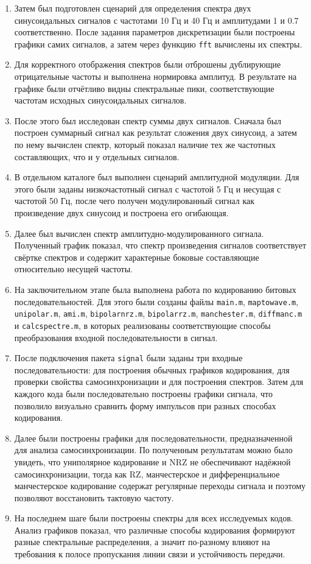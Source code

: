 \documentclass[
  english,
  russian,
  12pt,
  a4paper,
  DIV=11,
  numbers=noendperiod]{scrreprt}
\begin{document}
\begin{enumerate}
  показало, как с увеличением числа гармоник форма сигнала всё больше
  приближается к меандру.
\item
  Затем был подготовлен сценарий для определения спектра двух
  синусоидальных сигналов с частотами 10 Гц и 40 Гц и амплитудами 1 и
  0.7 соответственно. После задания параметров дискретизации были
  построены графики самих сигналов, а затем через функцию \texttt{fft}
  вычислены их спектры.
\item
  Для корректного отображения спектров были отброшены дублирующие
  отрицательные частоты и выполнена нормировка амплитуд. В результате на
  графике были отчётливо видны спектральные пики, соответствующие
  частотам исходных синусоидальных сигналов.
\item
  После этого был исследован спектр суммы двух сигналов. Сначала был
  построен суммарный сигнал как результат сложения двух синусоид, а
  затем по нему вычислен спектр, который показал наличие тех же
  частотных составляющих, что и у отдельных сигналов.
\item
  В отдельном каталоге был выполнен сценарий амплитудной модуляции. Для
  этого были заданы низкочастотный сигнал с частотой 5 Гц и несущая с
  частотой 50 Гц, после чего получен модулированный сигнал как
  произведение двух синусоид и построена его огибающая.
\item
  Далее был вычислен спектр амплитудно-модулированного сигнала.
  Полученный график показал, что спектр произведения сигналов
  соответствует свёртке спектров и содержит характерные боковые
  составляющие относительно несущей частоты.
\item
  На заключительном этапе была выполнена работа по кодированию битовых
  последовательностей. Для этого были созданы файлы \texttt{main.m},
  \texttt{maptowave.m}, \texttt{unipolar.m}, \texttt{ami.m},
  \texttt{bipolarnrz.m}, \texttt{bipolarrz.m}, \texttt{manchester.m},
  \texttt{diffmanc.m} и \texttt{calcspectre.m}, в которых реализованы
  соответствующие способы преобразования входной последовательности в
  сигнал.
\item
  После подключения пакета \texttt{signal} были заданы три входные
  последовательности: для построения обычных графиков кодирования, для
  проверки свойства самосинхронизации и для построения спектров. Затем
  для каждого кода были последовательно построены графики сигнала, что
  позволило визуально сравнить форму импульсов при разных способах
  кодирования.
\item
  Далее были построены графики для последовательности, предназначенной
  для анализа самосинхронизации. По полученным результатам можно было
  увидеть, что униполярное кодирование и NRZ не обеспечивают надёжной
  самосинхронизации, тогда как RZ, манчестерское и дифференциальное
  манчестерское кодирование содержат регулярные переходы сигнала и
  поэтому позволяют восстановить тактовую частоту.
\item
  На последнем шаге были построены спектры для всех исследуемых кодов.
  Анализ графиков показал, что различные способы кодирования формируют
  разные спектральные распределения, а значит по-разному влияют на
  требования к полосе пропускания линии связи и устойчивость передачи.
\end{enumerate}
\end{document}
